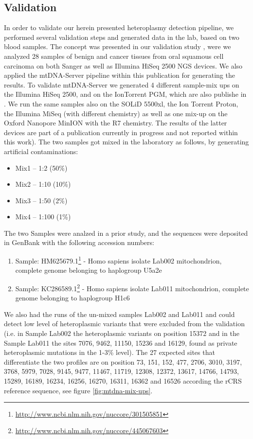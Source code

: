 \subsection{Validation}
In order to validate our herein presented heteroplasmy detection pipeline, we performed several validation steps and generated data in the lab, based on two blood samples. The concept was presented in our validation study \cite{Kloss-Brandstatter2015}, were we analyzed 28 samples of benign and cancer tissues from oral squamous cell carcinoma on both Sanger as well as Illumina HiSeq 2500 NGS devices. We also applied the mtDNA-Server pipeline within this publication for generating the results. To validate mtDNA-Server we generated 4 different sample-mix ups on the Illumina HiSeq 2500, and on the IonTorrent
PGM, which are also publishe in \cite{Weissensteiner2016b,Kloss-Brandstatter2015}. We run the same samples also on the SOLiD 5500xl, the Ion Torrent Proton, the Illumina MiSeq (with different chemistry) as well as one mix-up on the Oxford Nanopore MinION with the R7 chemistry. The results of the latter devices are part of a publication currently in progress and not reported within this work). The two samples got mixed in the laboratory as follows, by generating artificial contaminations: 
\begin{itemize}
\item Mix1 – 1:2 (50\%) 
\item Mix2 – 1:10 (10\%) 
\item Mix3 – 1:50 (2\%) 
\item Mix4 – 1:100 (1\%)
\end{itemize}
The two Samples were analzed in a prior study\cite{KlossBrandstatter2010}, and the sequences were deposited in GenBank with the following accession numbers:
\begin{enumerate}
\item Sample: HM625679.1\footnote{\url{http://www.ncbi.nlm.nih.gov/nuccore/301505851}} - Homo sapiens isolate Lab002 mitochondrion, complete genome  belonging to haplogroup U5a2e
\item Sample: KC286589.1\footnote{\url{http://www.ncbi.nlm.nih.gov/nuccore/445067603}} - Homo sapiens isolate Lab011 mitochondrion, complete genome  belonging to haplogroup H1c6
\end{enumerate}
We also had the runs of the un-mixed samples Lab002 and Lab011 and could detect low level of heteroplasmic variants that were excluded from the validation (i.e. in Sample Lab002 the heteroplasmic variants on position  15372 and in the Sample Lab011 the sites 7076, 9462, 11150, 15236 and 16129, found as private heteroplasmic mutations in the 1-3\% level). The 27 expected sites that differentiate the two profiles are on position 73, 151, 152, 477, 2706, 3010, 3197, 3768, 5979, 7028, 9145, 9477, 11467, 11719,
12308, 12372, 13617, 14766, 14793, 15289, 16189, 16234, 16256, 16270, 16311, 16362 and 16526 according the rCRS reference sequence, see figure \ref{fig:mtdna-mix-ups}. 

